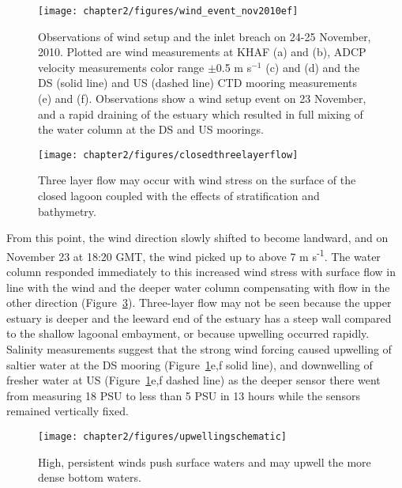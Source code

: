 \begin{figure}[t]
	\centering
	\texttt{[image: chapter2/figures/wind\_event\_nov2010ef]}
\caption{Observations of wind setup and the inlet breach on 24-25 November, 2010. Plotted are wind measurements at KHAF (a) and (b), ADCP velocity measurements color range $\pm $0.5 m s$^{-1}$ (c) and (d) and the DS (solid line) and US (dashed line) CTD mooring measurements (e) and (f). Observations show a wind setup event on 23 November, and a rapid draining of the estuary which resulted in full mixing of the water column at the DS and US moorings.}
\label{fig:closed_UVwindsalt}
\end{figure}


\begin{figure}[h]
	\centering
	\texttt{[image: chapter2/figures/closedthreelayerflow]}
\caption{Three layer flow may occur with wind stress on the surface of the closed lagoon coupled with the effects of stratification and bathymetry.} \label{fig:schematic3lf}
\end{figure}


From this point, the wind direction slowly shifted to become landward, and on November 23 at 18:20 GMT, the wind picked up to above 7 m s\textsuperscript{-1}. The water column responded immediately to this increased wind stress with surface flow in line with the wind and the  deeper water column compensating with flow in the other direction (Figure~\ref{fig:schematicupwelling}). Three-layer flow may not be seen because the upper estuary is deeper and the leeward end of the estuary has a steep wall compared to the shallow lagoonal embayment, or because upwelling occurred rapidly. Salinity measurements suggest that the strong wind forcing caused upwelling of saltier water at the DS mooring (Figure~\ref{fig:closed_UVwindsalt}e,f solid line), and downwelling of fresher water at US (Figure~\ref{fig:closed_UVwindsalt}e,f dashed line) as the deeper sensor there went from measuring 18 PSU to less than 5 PSU in 13 hours while the sensors remained vertically fixed.


\begin{figure}[h]
\centering
	\texttt{[image: chapter2/figures/upwellingschematic]}
\caption{High, persistent winds push surface waters and may upwell the more dense bottom waters.} \label{fig:schematicupwelling}
\end{figure}

